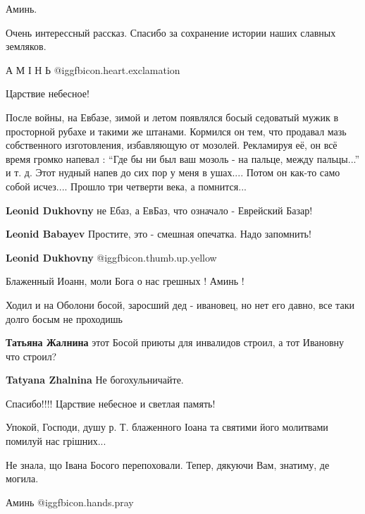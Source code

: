 \begin{itemize}
Аминь.

Очень интерессный рассказ. Спасибо за сохранение истории наших славных земляков.

А М І Н Ь @igg{fbicon.heart.exclamation}

Царствие небесное!


После войны, на Евбазе, зимой и летом появлялся босый седоватый мужик в
просторной рубахе и такими же штанами. Кормился он тем, что продавал мазь
собственного изготовления, избавляющую от мозолей. Рекламируя её, он всё время
громко напевал : \enquote{Где бы ни был ваш мозоль - на пальце, между пальцы...} и т. д.
Этот нудный напев до сих пор у меня в ушах.... Потом он как-то само собой
исчез.... Прошло три четверти века, а помнится...

\begin{itemize} %
\textbf{Leonid Dukhovny} не Ебаз, а ЕвБаз, что означало - Еврейский Базар!

\textbf{Leonid Babayev} Простите, это - смешная опечатка. Надо запомнить!

\textbf{Leonid Dukhovny}  @igg{fbicon.thumb.up.yellow} 

\end{itemize} %

Блаженный Иоанн, моли Бога о нас грешных ! Аминь !

Ходил и на Оболони босой, заросший дед - ивановец, но нет его давно, все таки
долго босым не проходишь

\begin{itemize} %
\textbf{Татьяна Жалнина} этот Босой приюты для инвалидов строил, а тот Ивановну что строил?

\textbf{Tatyana Zhalnina} Не богохульничайте.
\end{itemize} %

Спасибо!!!! Царствие небесное и светлая память!

Упокой, Господи, душу р. Т. блаженного Іоана та святими його молитвами помилуй нас грішних...

Не знала, що Івана Босого перепоховали. Тепер, дякуючи Вам, знатиму, де могила.

Аминь  @igg{fbicon.hands.pray} 


\end{itemize}
